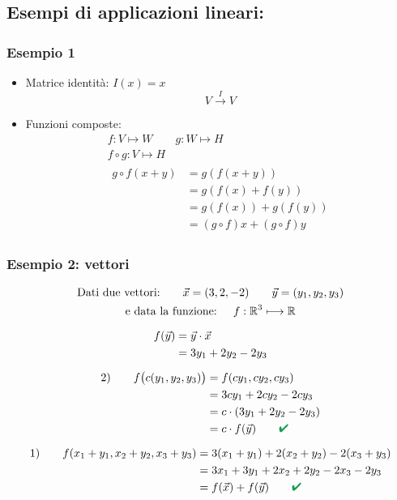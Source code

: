 \documentclass[italian]{article}
\renewcommand{\checkmark}{\textcolor{ForestGreen}{\text{$\qquad$\ding{52}}}}
\newcommand{\ins}[1]{\text{$\mathbb{#1}$}}
\begin{document}
\subsection{Esempi di applicazioni lineari:}
\subsubsection{Esempio 1}
\begin{itemize}
	\item 	Matrice identità: $I(x) = x$
			\[
				V \xrightarrow{I} V 	
			\]
	\item Funzioni composte:
			\begin{gather*}
				f: V \longmapsto W \qquad g: W \longmapsto H\\
				f\circ g: V \longmapsto H \\
				\begin{split}
					g \circ f(x+y) &= g(f(x+y))\\
					&= g(f(x)+f(y))\\
					&= g(f(x)) + g(f(y))\\
					&= (g\circ f)x + (g \circ f)y
				\end{split}
			\end{gather*}
\end{itemize}
\subsubsection{Esempio 2: vettori}
\begin{gather*}
	\text{Dati due vettori:} \qquad \vec{x} = (3,2,-2)\qquad \vec{y}=(y_1,y_2,y_3)\\
	\text{e data la funzione: } \quad  f: \ins{R}^3 \longmapsto \ins{R}\\[2mm]
	\begin{split}
		f(\vec{y}) &= \vec{y}\cdot \vec{x}\\
		&= 3y_1 + 2y_2 - 2y_3
	\end{split}\\[2mm]
	\begin{split}
		2) \qquad f \bigr(c(y_1,y_2,y_3) \bigr) &= f(cy_1,cy_2,cy_3) \\
		&= 3cy_1 + 2cy_2 - 2cy_3 \\
		&= c\cdot (3y_1 + 2y_2 - 2y_3) \\
		&= c \cdot f(\vec{y}) \checkmark
	\end{split}\\[2mm]
	\begin{split}
		1) \qquad f(x_1+y_1, x_2+y_2,x_3+y_3) &= 3(x_1+y_1) + 2(x_2+y_2) - 2(x_3+y_3) \\
		&= 3x_1 + 3y_1 + 2x_2 + 2y_2 - 2x_3 - 2y_3 \\
		&= f(\vec{x}) + f(\vec{y}) \checkmark 
	\end{split}
\end{gather*}
\newpage
\noindent
\end{document}
